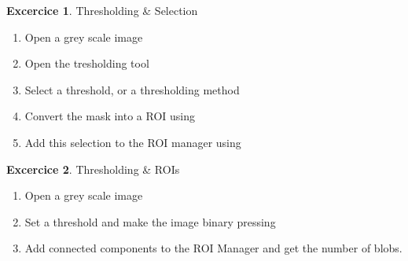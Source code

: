 \documentclass[xcolor=table]{article}
\theoremstyle{definition}
\newtheorem{exercice}{Excercice}
\begin{document}
\begin{exercice} Thresholding \& Selection
  \begin{enumerate}
     \item Open a grey scale image 
     \item Open the tresholding tool 
     \item Select a threshold, or a thresholding method
     \item Convert the mask into a ROI using 
     \item Add this selection to the ROI manager using 
  \end{enumerate}
\end{exercice}

\begin{exercice} Thresholding \& ROIs
  \begin{enumerate}
     \item Open a grey scale image
     \item Set a threshold and make the image binary pressing 
     \item Add connected components to the ROI Manager and get the
           number of blobs.
  \end{enumerate}
\end{exercice}
\end{document}

